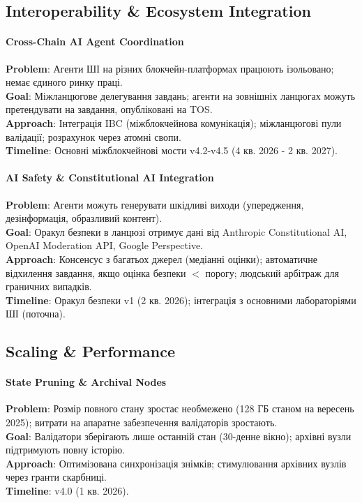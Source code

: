 \documentclass[11pt]{article}
\begin{document}
\subsection{Interoperability \& Ecosystem Integration}

\paragraph{Cross-Chain AI Agent Coordination}
\textbf{Problem}: Агенти ШІ на різних блокчейн-платформах працюють ізольовано; немає єдиного ринку праці.\\
\textbf{Goal}: Міжланцюгове делегування завдань; агенти на зовнішніх ланцюгах можуть претендувати на завдання, опубліковані на TOS.\\
\textbf{Approach}: Інтеграція IBC (міжблокчейнова комунікація); міжланцюгові пули валідації; розрахунок через атомні свопи.\\
\textbf{Timeline}: Основні міжблокчейнові мости v4.2-v4.5 (4 кв. 2026 - 2 кв. 2027).

\paragraph{AI Safety \& Constitutional AI Integration}
\textbf{Problem}: Агенти можуть генерувати шкідливі виходи (упередження, дезінформація, образливий контент).\\
\textbf{Goal}: Оракул безпеки в ланцюзі отримує дані від Anthropic Constitutional AI, OpenAI Moderation API, Google Perspective.\\
\textbf{Approach}: Консенсус з багатьох джерел (медіанні оцінки); автоматичне відхилення завдання, якщо оцінка безпеки $<$ порогу; людський арбітраж для граничних випадків.\\
\textbf{Timeline}: Оракул безпеки v1 (2 кв. 2026); інтеграція з основними лабораторіями ШІ (поточна).

\subsection{Scaling \& Performance}

\paragraph{State Pruning \& Archival Nodes}
\textbf{Problem}: Розмір повного стану зростає необмежено (128 ГБ станом на вересень 2025); витрати на апаратне забезпечення валідаторів зростають.\\
\textbf{Goal}: Валідатори зберігають лише останній стан (30-денне вікно); архівні вузли підтримують повну історію.\\
\textbf{Approach}: Оптимізована синхронізація знімків; стимулювання архівних вузлів через гранти скарбниці.\\
\textbf{Timeline}: v4.0 (1 кв. 2026).
\end{document}
